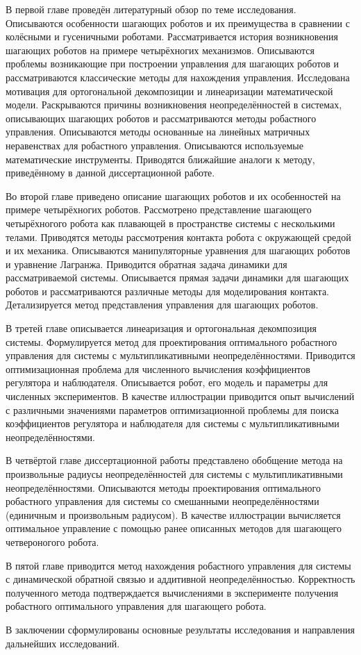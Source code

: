 В первой главе проведён литературный обзор по теме исследования. Описываются особенности шагающих роботов и их преимущества в сравнении с колёсными и гусеничными роботами. Рассматривается история возникновения шагающих роботов на примере четырёхногих механизмов. Описываются проблемы возникающие при построении управления для шагающих роботов и рассматриваются классические методы для нахождения управления. Исследована мотивация для ортогональной декомпозиции и линеаризации математической модели. Раскрываются причины возникновения неопределённостей в системах, описывающих шагающих роботов и рассматриваются методы робастного управления. 
Описываются методы основанные на линейных матричных неравенствах для робастного управления. Описываются используемые математические инструменты. Приводятся ближайшие аналоги к методу, приведённому в данной диссертационной работе.

Во второй главе приведено описание шагающих роботов и их особенностей на примере четырёхногих роботов. Рассмотрено представление шагающего четырёхногого робота как плавающей в пространстве системы с несколькими телами. Приводятся методы рассмотрения контакта робота с окружающей средой и их механика. Описываются манипуляторные уравнения для шагающих роботов и уравнение Лагранжа. Приводится обратная задача динамики для рассматриваемой системы. Описывается прямая задачи динамики для шагающих роботов и рассматриваются различные методы для моделирования контакта. Детализируется метод представления управления для шагающих роботов.

В третей главе описывается линеаризация и ортогональная декомпозиция системы. Формулируется метод для проектирования оптимального робастного управления для системы с мультипликативными неопределённостями. Приводится оптимизационная проблема для численного вычисления коэффициентов регулятора и наблюдателя. Описывается робот, его модель и параметры для численных экспериментов. В качестве иллюстрации приводится опыт вычислений с различными значениями параметров оптимизационной проблемы для поиска коэффициентов регулятора и наблюдателя для системы с мультипликативными неопределённостями. 

В четвёртой главе диссертационной работы представлено обобщение метода на произвольные радиусы неопределённостей для системы с мультипликативными неопределённостями. Описываются методы проектирования оптимального робастного управления для системы со смешанными неопределённостями (единичным и произвольным радиусом). В качестве иллюстрации вычисляется оптимальное управление с помощью ранее описанных методов для шагающего четвероногого робота.

В пятой главе приводится метод нахождения робастного управления для системы с динамической обратной связью и аддитивной неопределённостью. Корректность полученного метода подтверждается вычислениями в эксперименте получения робастного оптимального управления для шагающего робота.

В заключении сформулированы основные результаты исследования и направления дальнейших исследований.